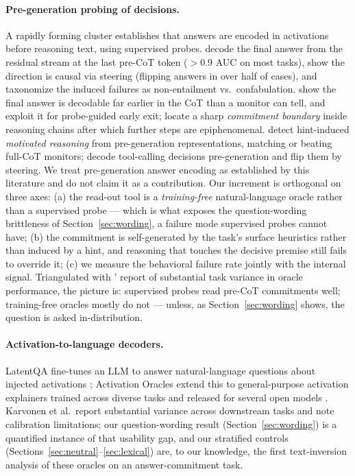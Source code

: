 \documentclass[11pt]{article}
\begin{document}
\paragraph{Pre-generation probing of decisions.} A rapidly forming
cluster establishes that answers are encoded in activations before
reasoning text, using supervised probes. \citet{cox} decode the final
answer from the residual stream at the last pre-CoT token ($>$0.9 AUC on
most tasks), show the direction is causal via steering (flipping answers
in over half of cases), and taxonomize the induced failures as
non-entailment vs.\ confabulation. \citet{boppana} show the final answer
is decodable far earlier in the CoT than a monitor can tell, and exploit
it for probe-guided early exit; \citet{scalena} locate a sharp
\emph{commitment boundary} inside reasoning chains after which further
steps are epiphenomenal. \citet{mirtaheri} detect hint-induced
\emph{motivated reasoning} from pre-generation representations, matching
or beating full-CoT monitors; \citet{esakkiraja} decode tool-calling
decisions pre-generation and flip them by steering. We treat
pre-generation answer encoding as established by this literature and do
not claim it as a contribution. Our increment is orthogonal on three
axes: (a) the read-out tool is a \emph{training-free} natural-language
oracle rather than a supervised probe --- which is what exposes the
question-wording brittleness of Section~\ref{sec:wording}, a failure
mode supervised probes cannot have; (b) the commitment is self-generated
by the task's surface heuristics rather than induced by a hint, and
reasoning that touches the decisive premise still fails to override it;
(c) we measure the behavioral failure rate jointly with the internal
signal. Triangulated with \citet{oracles}' report of substantial task
variance in oracle performance, the picture is: supervised probes read
pre-CoT commitments well; training-free oracles mostly do not ---
unless, as Section~\ref{sec:wording} shows, the question is asked
in-distribution.

\paragraph{Activation-to-language decoders.} LatentQA fine-tunes an LLM to
answer natural-language questions about injected activations
\citep{latentqa}; Activation Oracles extend this to general-purpose
activation explainers trained across diverse tasks and released for
several open models \citep{oracles}. Karvonen et al.\ report substantial
variance across downstream tasks and note calibration limitations; our
question-wording result (Section~\ref{sec:wording}) is a quantified
instance of that usability gap, and our stratified controls
(Sections~\ref{sec:neutral}--\ref{sec:lexical}) are, to our knowledge, the
first text-inversion analysis of these oracles on an answer-commitment
task.
\end{document}
